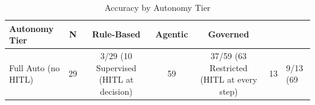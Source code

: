 \begin{table}[h]
\centering
\caption{Accuracy by Autonomy Tier}
\label{tab:tier_breakdown}
\small
\begin{tabular}{lcccc}
\hline
\textbf{Autonomy Tier} & \textbf{N} & \textbf{Rule-Based} & \textbf{Agentic} & \textbf{Governed} \\
\hline
Full Auto (no HITL) & 29 & 3/29 (10%
Supervised (HITL at decision) & 59 & 37/59 (63%
Restricted (HITL at every step) & 13 & 9/13 (69%
\hline
\end{tabular}
\end{table}
